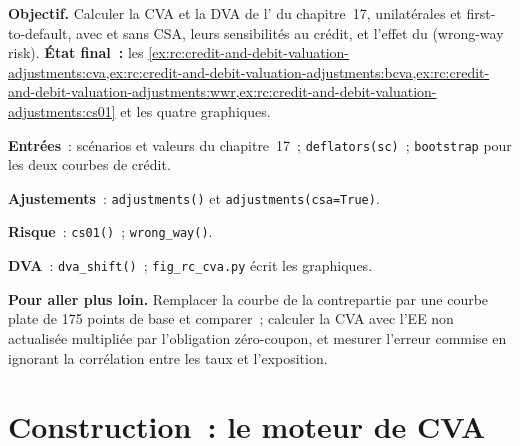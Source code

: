 \begin{tutorial}
\textbf{Objectif.} Calculer la CVA et la DVA de l' du chapitre~17, unilatérales et
first-to-default, avec et sans CSA, leurs sensibilités au crédit, et l'effet du
 (wrong-way risk). \textbf{État final~:} les
\cref{ex:rc:credit-and-debit-valuation-adjustments:cva,ex:rc:credit-and-debit-valuation-adjustments:bcva,ex:rc:credit-and-debit-valuation-adjustments:wwr,ex:rc:credit-and-debit-valuation-adjustments:cs01}
et les quatre graphiques.
\begin{tutsteps}
\item \textbf{Entrées}~: scénarios et valeurs du chapitre~17~; \texttt{deflators(sc)}~;
\texttt{bootstrap} pour les deux courbes de crédit.
\item \textbf{Ajustements}~: \texttt{adjustments()} et \texttt{adjustments(csa=True)}.
\item \textbf{Risque}~: \texttt{cs01()}~; \texttt{wrong\_way()}.
\item \textbf{DVA}~: \texttt{dva\_shift()}~; \texttt{fig\_rc\_cva.py} écrit les graphiques.
\end{tutsteps}
\textbf{Pour aller plus loin.} Remplacer la courbe de la contrepartie par une courbe plate de 175 points de base et
comparer~; calculer la CVA avec l'EE non actualisée multipliée par l'obligation zéro-coupon, et mesurer
l'erreur commise en ignorant la corrélation entre les taux et l'exposition.
\end{tutorial}

\section{Construction~: le moteur de CVA}\label{bld:rc:credit-and-debit-valuation-adjustments:cva}

